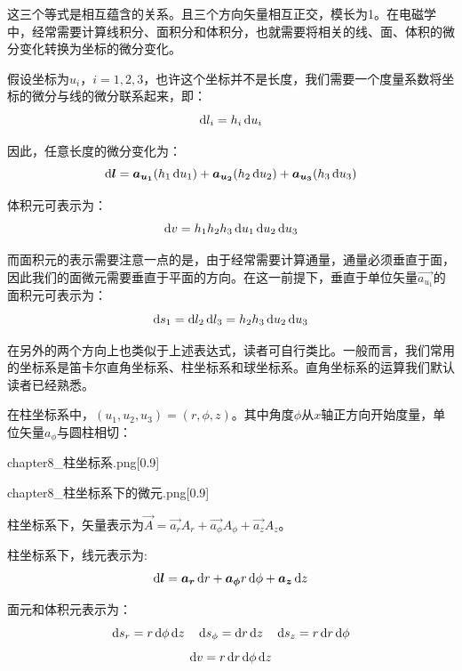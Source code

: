 这三个等式是相互蕴含的关系。且三个方向矢量相互正交，模长为1。在电磁学中，经常需要计算线积分、面积分和体积分，也就需要将相关的线、面、体积的微分变化转换为坐标的微分变化。

假设坐标为$u_i$，$i=1,2,3$，也许这个坐标并不是长度，我们需要一个度量系数将坐标的微分与线的微分联系起来，即：
\[\dif l_i = h_i\dif u_i\]

因此，任意长度的微分变化为：
\[\dif \vec{l} = \vec{a_{u_1}}(h_1\dif u_1) + \vec{a_{u_2}}(h_2\dif u_2) + \vec{a_{u_3}}(h_3\dif u_3)\]

体积元可表示为：
\[\dif v = h_1h_2h_3\dif u_1\dif u_2\dif u_3\]

而面积元的表示需要注意一点的是，由于经常需要计算通量，通量必须垂直于面，因此我们的面微元需要垂直于平面的方向。在这一前提下，垂直于单位矢量$\vec{a_{u_1}}$的面积元可表示为：
\[\dif s_1 = \dif l_2\dif l_3 = h_2h_3\dif u_2\dif u_3\]

在另外的两个方向上也类似于上述表达式，读者可自行类比。一般而言，我们常用的坐标系是笛卡尔直角坐标系、柱坐标系和球坐标系。直角坐标系的运算我们默认读者已经熟悉。

在柱坐标系中，$(u_1,u_2,u_3) = (r,\phi,z)$。其中角度$\phi$从$x$轴正方向开始度量，单位矢量$a_{\phi}$与圆柱相切：

\begin{minipage}{0.48\textwidth}
    \begin{singlefigure}[柱坐标系]{chapter8_柱坐标系.png}[0.9]
    \end{singlefigure}
\end{minipage}
\begin{minipage}{0.48\textwidth}
    \begin{singlefigure}[柱坐标系下的微元]{chapter8_柱坐标系下的微元.png}[0.9]
    \end{singlefigure}
\end{minipage}
\vspace{2mm}

柱坐标系下，矢量表示为$\vec{A} = \vec{a_r}A_r + \vec{a_\phi}A_\phi + \vec{a_z}A_z$。

柱坐标系下，线元表示为:
\[\dif\vec{l} = \vec{a_r}\dif r + \vec{a_\phi}r\dif \phi + \vec{a_z}\dif z\]

面元和体积元表示为：
\[\dif s_r = r\dif\phi\dif z\quad \dif s_\phi = \dif r\dif z\quad \dif s_z = r\dif r\dif\phi\]
\[\dif v = r\dif r\dif\phi\dif z\]

